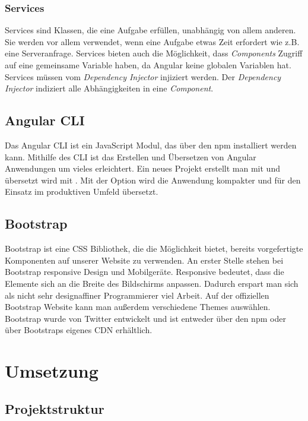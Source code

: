 \subsubsection{Services}
\label{sec:ang-services}
Services sind Klassen, die eine Aufgabe erfüllen, unabhängig von allem anderen. Sie werden vor allem verwendet, wenn eine Aufgabe etwas Zeit erfordert wie z.B. eine Serveranfrage. Services bieten auch die Möglichkeit, dass \textit{Components} Zugriff auf eine gemeinsame Variable haben, da Angular keine globalen Variablen hat. Services müssen vom \textit{Dependency Injector} injiziert werden. Der \textit{Dependency Injector} indiziert alle Abhängigkeiten in eine \textit{Component}.

\subsection{Angular CLI}
\label{sec:vor-angular-cli}
Das Angular \ac{CLI} ist ein JavaScript Modul, das über den \ac{npm} installiert werden kann. Mithilfe des \ac{CLI} ist das Erstellen und Übersetzen von Angular Anwendungen um vieles erleichtert. Ein neues Projekt erstellt man mit  und übersetzt wird mit . Mit der Option  wird die Anwendung kompakter und für den Einsatz im produktiven Umfeld übersetzt.

\subsection{Bootstrap}
\label{sec:vor-bootstrap}
Bootstrap ist eine CSS Bibliothek, die die Möglichkeit bietet, bereits vorgefertigte Komponenten auf unserer Website zu verwenden. An erster Stelle stehen bei Bootstrap responsive Design und Mobilgeräte. Responsive bedeutet, dass die Elemente sich an die Breite des Bildschirms anpassen. Dadurch erspart man sich als nicht sehr designaffiner Programmierer viel Arbeit. Auf der offiziellen Bootstrap Website kann man außerdem verschiedene Themes auswählen. Bootstrap wurde von Twitter entwickelt und ist entweder über den \ac{npm} oder über Bootstraps eigenes \ac{CDN} erhältlich.

\newpage
\section{Umsetzung}
\label{sec:umsetzung}

\subsection{Projektstruktur}
\label{sec:ums-projektstruktur}

